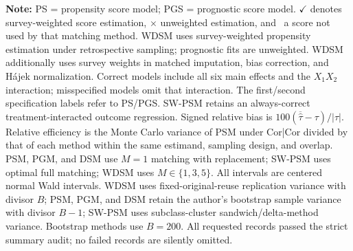 \begin{table}
\begin{tabular}{@{} >{\centering\arraybackslash}p{1.3cm} l c c *{4}{c} *{4}{c} *{4}{c} @{}}
\bottomrule
\end{tabular}
\vspace{0.5em}
\begin{minipage}{\textwidth}
\footnotesize
\textbf{Note:} PS = propensity score model; PGS = prognostic score model. $\checkmark$ denotes survey-weighted score estimation, $\times$ unweighted estimation, and \textendash\, a score not used by that matching method. WDSM uses survey-weighted propensity estimation under retrospective sampling; prognostic fits are unweighted. WDSM additionally uses survey weights in matched imputation, bias correction, and H\'ajek normalization. Correct models include all six main effects and the $X_1X_2$ interaction; misspecified models omit that interaction. The first/second specification labels refer to PS/PGS. SW-PSM retains an always-correct treatment-interacted outcome regression. Signed relative bias is $100(\overline{\widehat\tau}-\tau)/|\tau|$. Relative efficiency is the Monte Carlo variance of PSM under Cor|Cor divided by that of each method within the same estimand, sampling design, and overlap. PSM, PGM, and DSM use $M=1$ matching with replacement; SW-PSM uses optimal full matching; WDSM uses $M\in\{1,3,5\}$. All intervals are centered normal Wald intervals. WDSM uses fixed-original-reuse replication variance with divisor $B$; PSM, PGM, and DSM retain the author's bootstrap sample variance with divisor $B-1$; SW-PSM uses subclass-cluster sandwich/delta-method variance. Bootstrap methods use $B=200$. All requested records passed the strict summary audit; no failed records are silently omitted.
\end{minipage}
\end{table}


